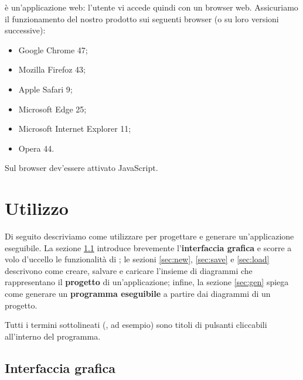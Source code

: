 \proj{} è un'applicazione web: l'utente vi accede quindi con un browser web. Assicuriamo il funzionamento del nostro prodotto sui seguenti browser (o su loro versioni successive):
\begin{itemize}
	\item Google Chrome 47;
	\item Mozilla Firefoz 43;
	\item Apple Safari 9;
	\item Microsoft Edge 25;
	\item Microsoft Internet Explorer 11;
	\item Opera 44.
\end{itemize}
Sul browser dev'essere attivato JavaScript.






\section{Utilizzo} \label{sec:utilizzo}

Di seguito descriviamo come utilizzare \proj{} per progettare e generare un'applicazione eseguibile. La sezione \ref{sec:gui} introduce brevemente l'\textbf{interfaccia grafica} e scorre a volo d'uccello le funzionalità di \proj; le sezioni \ref{sec:new}, \ref{sec:save} e \ref{sec:load} descrivono come creare, salvare e caricare l'insieme di diagrammi che rappresentano il \textbf{progetto} di un'applicazione; infine, la sezione \ref{sec:gen} spiega come generare un \textbf{programma eseguibile} a partire dai diagrammi di un progetto.

Tutti i termini sottolineati (, ad esempio) sono titoli di pulsanti cliccabili all'interno del programma.



\subsection{Interfaccia grafica} \label{sec:gui}

